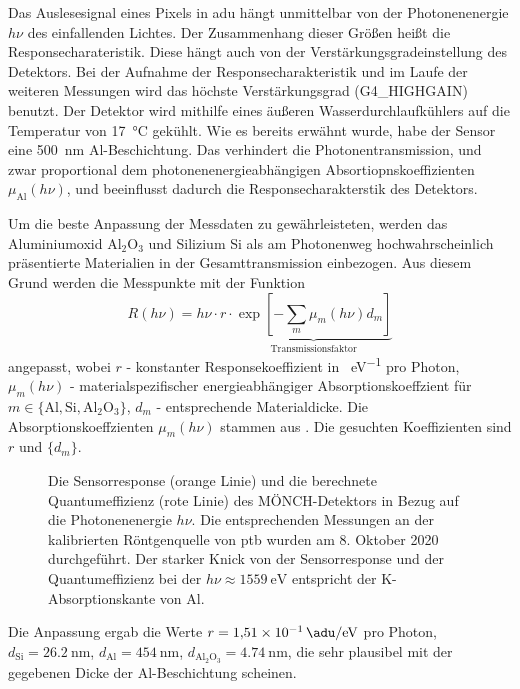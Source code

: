 \noindent
Das Auslesesignal eines Pixels in \gls{adu} hängt unmittelbar von der Photonenenergie $h\nu$ des einfallenden Lichtes. Der Zusammenhang dieser Größen heißt die Responsecharateristik. Diese hängt auch von der Verstärkungsgradeinstellung des Detektors. Bei der Aufnahme der Responsecharakteristik und im Laufe der weiteren Messungen wird das höchste Verstärkungsgrad (G4\_HIGHGAIN) benutzt. Der Detektor wird mithilfe eines äußeren Wasserdurchlaufkühlers auf die Temperatur von \SI{17}{\celsius} gekühlt. Wie es bereits erwähnt wurde, habe der Sensor eine \SI{500}{\nano\meter} Al-Beschichtung. Das verhindert die Photonentransmission, und zwar proportional dem photonenenergieabhängigen Absortiopnskoeffizienten $\mu_\text{Al}(h\nu)$, und beeinflusst dadurch die Responsecharakterstik des Detektors.
%     

\noindent
Um die beste Anpassung der Messdaten zu gewährleisteten, werden das Aluminiumoxid Al$_2$O$_3$ und Silizium Si als am Photonenweg hochwahrscheinlich präsentierte Materialien in der Gesamttransmission einbezogen. Aus diesem Grund werden die Messpunkte mit der Funktion
\begin{equation}
    R(h\nu) = h\nu\cdot r\cdot\underbrace{\exp\left[-\sum_{m}\mu_m(h\nu)d_m\right]}_{\text{Transmissionsfaktor}}
\label{eq:response_durchschnitt}
\end{equation}
angepasst, wobei $r$ - konstanter Responsekoeffizient in \si{\adu\per\eV} pro Photon, $\mu_m(h\nu)$ - materialspezifischer energieabhängiger Absorptionskoeffzient für $m \in \{\text{Al}, \text{Si}, \text{Al$_2$O$_3$}\}$,  $d_m$ - entsprechende Materialdicke. Die Absorptionskoeffzienten $\mu_m(h\nu)$ stammen aus \cite{xray-coeffs}. Die gesuchten Koeffizienten sind $r$ und $\{d_m\}$.
\begin{figure}[H]
    \centering
    
    \caption{Die Sensorresponse (orange Linie) und die berechnete Quantumeffizienz (rote Linie) des MÖNCH-Detektors in Bezug auf die Photonenenergie $h\nu$. Die entsprechenden Messungen an der kalibrierten Röntgenquelle von \gls{ptb} wurden am 8. Oktober 2020 durchgeführt. Der starker Knick von der Sensorresponse und der Quantumeffizienz bei der $h\nu \approx \SI{1559}{\eV}$ entspricht der K-Absorptionskante von Al.}
    \label{fig:response_moench}
\end{figure}
\noindent
Die Anpassung ergab die Werte
$r = \SI{1.51e-1}{\adu\per\eV}$ pro Photon, $d_\text{Si} = \SI{26.2}{\nano\meter}$, $d_\text{Al} = \SI{454}{\nano\meter}$,
$d_\text{Al$_2$O$_3$} = \SI{4.74}{\nano\meter}$, die sehr plausibel mit der gegebenen Dicke der Al-Beschichtung scheinen.

